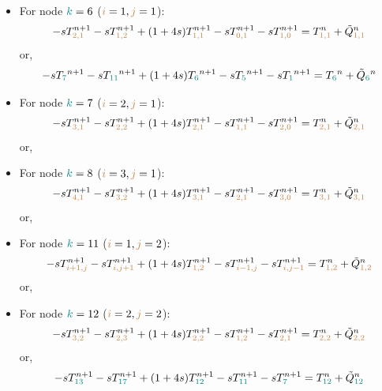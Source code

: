 \begin{itemize}
\item For node ${\color{teal}k}=6$ (${\color{brown}i}=1,{\color{brown}j}=1$):
\begin{equation}
-s T_{{\color{brown}2,1}}^{n+1}
-s T_{{\color{brown}1,2}}^{n+1} 
+(1+4s)T_{{\color{brown}1,1}}^{n+1} 
-s T_{{\color{brown}0,1}}^{n+1} 
-s T_{{\color{brown}1,0}}^{n+1} 
= T_{{\color{brown}1,1}}^n +\tilde{Q}_{{\color{brown}1,1}}^n
\end{equation}
or, 
\begin{equation}
-s T_{\color{teal} 7}^{n+1}-s T_{\color{teal} 11}^{n+1} +(1+4s)T_{\color{teal} 6}^{n+1} -s T_{\color{teal} 5}^{n+1} -s T_{\color{teal} 1}^{n+1} 
= T_{\color{teal} 6}^n +\tilde{Q}_{\color{teal} 6}^n
\end{equation}

\item For node ${\color{teal}k}=7$ (${\color{brown}i}=2,{\color{brown}j}=1$):
\begin{equation}
-s T_{{\color{brown} 3,1}}^{n+1}
-s T_{{\color{brown}2,2}}^{n+1} 
+(1+4s)T_{{\color{brown}2,1}}^{n+1} 
-s T_{{\color{brown}1,1}}^{n+1} 
-s T_{{\color{brown}2,0}}^{n+1} 
= T_{{\color{brown}2,1}}^n 
+\tilde{Q}_{{\color{brown}2,1}}^n
\end{equation}
or,


\item For node ${\color{teal}k}=8$ (${\color{brown}i}=3,{\color{brown}j}=1$):
\[
-s T_{{\color{brown} 4,1}}^{n+1}
-s T_{{\color{brown}3,2}}^{n+1} 
+(1+4s)T_{{\color{brown}3,1}}^{n+1} 
-s T_{{\color{brown}2,1}}^{n+1} 
-s T_{{\color{brown}3,0}}^{n+1} 
= T_{{\color{brown}3,1}}^n 
+\tilde{Q}_{{\color{brown}3,1}}^n
\]
or,
\item For node ${\color{teal}k}=11$ (${\color{brown}i}=1,{\color{brown}j}=2$):
\[
-s T_{{\color{brown} i+1,j}}^{n+1}
-s T_{{\color{brown}i,j+1}}^{n+1} 
+(1+4s)T_{{\color{brown}1,2}}^{n+1} 
-s T_{{\color{brown}i-1,j}}^{n+1} 
-s T_{{\color{brown}i,j-1}}^{n+1} 
= T_{{\color{brown}1,2}}^n 
+\tilde{Q}_{{\color{brown}1,2}}^n
\]
or,
\item For node ${\color{teal}k}=12$ (${\color{brown}i}=2,{\color{brown}j}=2$):
\[
-s T_{{\color{brown} 3,2}}^{n+1}
-s T_{{\color{brown}2,3}}^{n+1} 
+(1+4s)T_{{\color{brown}2,2}}^{n+1} 
-s T_{{\color{brown}1,2}}^{n+1} 
-s T_{{\color{brown}2,1}}^{n+1} 
= T_{{\color{brown}2,2}}^n 
+\tilde{Q}_{{\color{brown}2,2}}^n
\]
or,
\[
-s T_{{\color{teal} 13}}^{n+1}
-s T_{{\color{teal} 17}}^{n+1} 
+(1+4s)T_{{\color{teal}12}}^{n+1} 
-s T_{{\color{teal}11}}^{n+1} 
-s T_{{\color{teal}7}}^{n+1} 
= T_{{\color{teal}12}}^n 
+\tilde{Q}_{{\color{teal}12}}^n
\]



\end{itemize}
